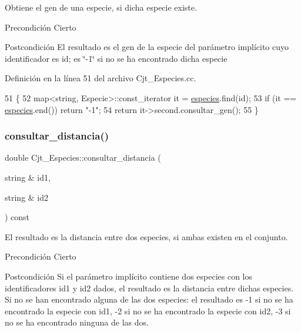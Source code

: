 Obtiene el gen de una especie, si dicha especie existe. 

\begin{DoxyPrecond}{Precondición}
Cierto 
\end{DoxyPrecond}
\begin{DoxyPostcond}{Postcondición}
El resultado es el gen de la especie del parámetro implícito cuyo identificador es id; es \char`\"{}-\/1\char`\"{} si no se ha encontrado dicha especie 
\end{DoxyPostcond}


Definición en la línea 51 del archivo Cjt\+\_\+\+Especies.\+cc.


\begin{DoxyCode}
51                                                        \{
52   map<string, Especie>::const\_iterator it = \hyperlink{class_cjt___especies_a8f319699bd2e8a42b85ec47b67c17563}{especies}.find(\textcolor{keywordtype}{id});
53   \textcolor{keywordflow}{if} (it == \hyperlink{class_cjt___especies_a8f319699bd2e8a42b85ec47b67c17563}{especies}.end()) \textcolor{keywordflow}{return} \textcolor{stringliteral}{"-1"};
54   \textcolor{keywordflow}{return} it->second.consultar\_gen();
55 \}
\end{DoxyCode}
\mbox{\label{class_cjt___especies_a55f41bd03feccf515a491abca95bd60f}} 
\subsubsection{\texorpdfstring{consultar\+\_\+distancia()}{consultar\_distancia()}}
{\footnotesize\ttfamily double Cjt\+\_\+\+Especies\+::consultar\+\_\+distancia (\begin{DoxyParamCaption}\item[{string \&}]{id1,  }\item[{string \&}]{id2 }\end{DoxyParamCaption}) const}



El resultado es la distancia entre dos especies, si ambas existen en el conjunto. 

\begin{DoxyPrecond}{Precondición}
Cierto 
\end{DoxyPrecond}
\begin{DoxyPostcond}{Postcondición}
Si el parámetro implícito contiene dos especies con los identificadores id1 y id2 dados, el resultado es la distancia entre dichas especies. Si no se han encontrado alguna de las dos especies\+: el resultado es -\/1 si no se ha encontrado la especie con id1, -\/2 si no se ha encontrado la especie con id2, -\/3 si no se ha encontrado ninguna de las dos. 
\end{DoxyPostcond}


